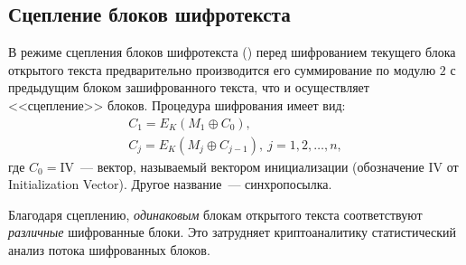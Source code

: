 


\subsection{Сцепление блоков шифротекста}

В режиме сцепления блоков шифротекста () перед шифрованием текущего блока открытого текста предварительно производится его суммирование по модулю $2$ с предыдущим блоком зашифрованного текста, что и осуществляет <<сцепление>> блоков. Процедура шифрования имеет вид:
\[ \begin{array}{l}
    C_1 = E_K(M_1 \oplus C_0), \\
    C_j = E_K(M_j \oplus C_{j-1}), ~ j = 1, 2, \dots, n,
\end{array} \]
где $C_0 = \textrm{IV}$~--- вектор, называемый вектором инициализации (обозначение $\textrm{IV}$ от Initialization Vector). Другое название~--- синхропосылка.

Благодаря сцеплению, \emph{одинаковым} блокам открытого текста соответствуют \emph{различные} шифрованные блоки. Это затрудняет криптоаналитику статистический анализ потока шифрованных блоков.

